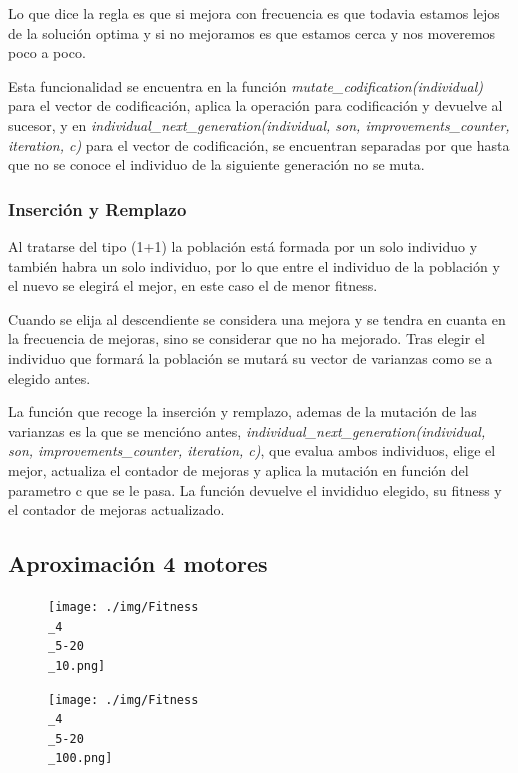 \documentclass[12pt, spanish, pdftex]{UC3M_document}
\begin{document}
Lo que dice la regla es que si mejora con frecuencia es que todavia estamos lejos de la solución optima y si no mejoramos es que estamos cerca y nos moveremos poco a poco.

Esta funcionalidad se encuentra en la función \textit{mutate\_codification(individual)} para el vector de codificación, aplica la operación para codificación y devuelve al sucesor, y en \textit{individual\_next\_generation(individual, son, improvements\_counter, iteration, c)} para el vector de codificación, se encuentran separadas por que hasta que no se conoce el individuo de la siguiente generación no se muta.

\subsubsection{Inserción y Remplazo}
Al tratarse del tipo (1+1) la población está formada por un solo individuo y también habra un solo individuo, por lo que entre el individuo de la población y el nuevo se elegirá el mejor, en este caso el de menor fitness.

Cuando se elija al descendiente se considera una mejora y se tendra en cuanta en la frecuencia de mejoras, sino se considerar que no ha mejorado. Tras elegir el individuo que formará la población se mutará su vector de varianzas como se a elegido antes.

La función que recoge la inserción y remplazo, ademas de la mutación de las varianzas es la que se mencióno antes, \textit{individual\_next\_generation(individual, son, improvements\_counter, iteration, c)}, que evalua ambos individuos, elige el mejor, actualiza el contador de mejoras y aplica la mutación en función del parametro c que se le pasa. La función devuelve el invididuo elegido, su fitness y el contador de mejoras actualizado. 

\subsection{Aproximación 4 motores}

\begin{figure}[H]
	{\texttt{[image: ./img/Fitness\\\_4\\\_5-20\\\_10.png]}}
\end{figure}
\begin{figure}[H]
	{\texttt{[image: ./img/Fitness\\\_4\\\_5-20\\\_100.png]}}
\end{figure}
\end{document}
